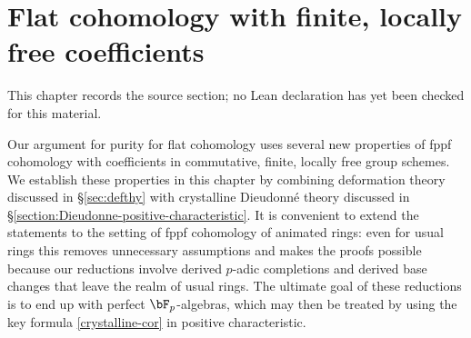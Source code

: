 \chapter{Flat cohomology with finite, locally free coefficients}
\label{purity-flat-cohomology-chapter-05}

\begin{remark}
\label{purity-flat-cohomology-chapter-05-source}
This chapter records the source section; no Lean declaration has yet been checked for this material.
\notready
\end{remark}

\label{reduction}



Our argument for %
purity for flat cohomology uses several new properties of fppf cohomology with coefficients in commutative, finite, locally free group schemes. We establish these properties in this chapter by combining deformation theory discussed in \S\ref{sec:defthy} with crystalline Dieudonn\'{e} theory discussed in \S\ref{section:Dieudonne-positive-characteristic}. It is convenient to extend the statements to the setting of fppf cohomology of animated rings: even for usual rings this removes unnecessary assumptions and makes the proofs possible because our reductions involve derived $p$-adic completions and derived base changes that leave the realm of usual rings. The ultimate goal of these reductions is to end up with perfect $\bF_p$-algebras, %
which may then be treated by using the key formula \eqref{crystalline-cor} in positive characteristic. %







 \label{sec:defthy}


